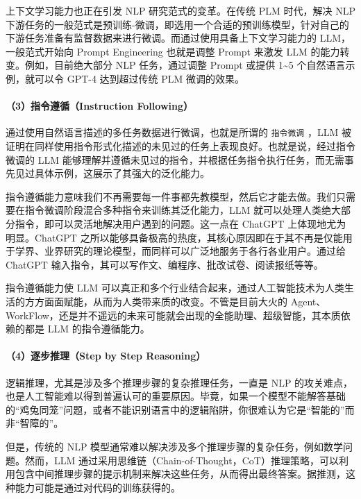 \documentclass[
]{article}
\begin{document}
上下文学习能力也正在引发 NLP 研究范式的变革。在传统 PLM 时代，解决 NLP
下游任务的一般范式是预训练-微调，即选用一个合适的预训练模型，针对自己的下游任务准备有监督数据来进行微调。而通过使用具备上下文学习能力的
LLM，一般范式开始向 Prompt Engineering 也就是调整 Prompt 来激发 LLM
的能力转变。例如，目前绝大部分 NLP 任务，通过调整 Prompt 或提供
1\textasciitilde5 个自然语言示例，就可以令 GPT-4 达到超过传统 PLM
微调的效果。

\paragraph{（3）指令遵循（Instruction
Following）}\label{ux6307ux4ee4ux9075ux5faainstruction-following}

通过使用自然语言描述的多任务数据进行微调，也就是所谓的 \texttt{指令微调}
，LLM
被证明在同样使用指令形式化描述的未见过的任务上表现良好。也就是说，经过指令微调的
LLM
能够理解并遵循未见过的指令，并根据任务指令执行任务，而无需事先见过具体示例，这展示了其强大的泛化能力。

指令遵循能力意味我们不再需要每一件事都先教模型，然后它才能去做。我们只需要在指令微调阶段混合多种指令来训练其泛化能力，LLM
就可以处理人类绝大部分指令，即可以灵活地解决用户遇到的问题。这一点在
ChatGPT 上体现地尤为明显。ChatGPT
之所以能够具备极高的热度，其核心原因即在于其不再是仅能用于学界、业界研究的理论模型，而同样可以广泛地服务于各行各业用户。通过给
ChatGPT 输入指令，其可以写作文、编程序、批改试卷、阅读报纸等等。

指令遵循能力使 LLM
可以真正和多个行业结合起来，通过人工智能技术为人类生活的方方面面赋能，从而为人类带来质的改变。不管是目前大火的
Agent、WorkFlow，还是并不遥远的未来可能就会出现的全能助理、超级智能，其本质依赖的都是
LLM 的指令遵循能力。

\paragraph{（4）逐步推理（Step by Step
Reasoning）}\label{ux9010ux6b65ux63a8ux7406step-by-step-reasoning}

逻辑推理，尤其是涉及多个推理步骤的复杂推理任务，一直是 NLP
的攻关难点，也是人工智能难以得到普遍认可的重要原因。毕竟，如果一个模型不能解答基础的``鸡兔同笼''问题，或者不能识别语言中的逻辑陷阱，你很难认为它是``智能的''而非``智障的''。

但是，传统的 NLP
模型通常难以解决涉及多个推理步骤的复杂任务，例如数学问题。然而，LLM
通过采用思维链（Chain-of-Thought，CoT）推理策略，可以利用包含中间推理步骤的提示机制来解决这些任务，从而得出最终答案。据推测，这种能力可能是通过对代码的训练获得的。
\end{document}
